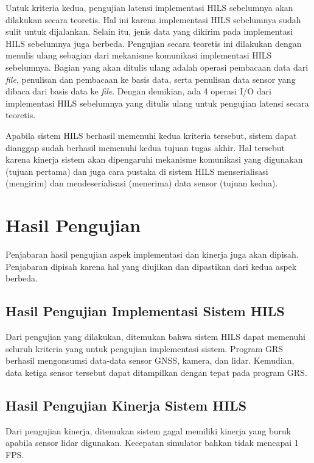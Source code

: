 Untuk kriteria kedua, pengujian latensi implementasi HILS sebelumnya akan
dilakukan secara teoretis. Hal ini karena implementasi HILS sebelumnya sudah
sulit untuk dijalankan. Selain itu, jenis data yang dikirim pada implementasi
HILS sebelumnya juga berbeda. Pengujian secara teoretis ini dilakukan dengan
menulis ulang sebagian dari mekanisme komunikasi implementasi HILS sebelumnya.
Bagian yang akan ditulis ulang adalah operasi pembacaan data dari \textit{file},
penulisan dan pembacaan ke basis data, serta penulisan data sensor yang dibaca
dari basis data ke \textit{file}. Dengan demikian, ada 4 operasi I/O dari
implementasi HILS sebelumnya yang ditulis ulang untuk pengujian latensi secara
teoretis.

Apabila sistem HILS berhasil memenuhi kedua kriteria tersebut, sistem dapat
dianggap sudah berhasil memenuhi kedua tujuan tugas akhir. Hal tersebut karena
kinerja sistem akan dipengaruhi mekanisme komunikasi yang digunakan (tujuan
pertama) dan juga cara pustaka di sistem HILS menserialisasi (mengirim) dan
mendeserialisasi (menerima) data sensor (tujuan kedua).

\section{Hasil Pengujian}

Penjabaran hasil pengujian aspek implementasi dan kinerja juga akan dipisah.
Penjabaran dipisah karena hal yang diujikan dan dipastikan dari kedua aspek
berbeda.

\subsection{Hasil Pengujian Implementasi Sistem HILS}

Dari pengujian yang dilakukan, ditemukan bahwa sistem HILS dapat memenuhi
seluruh kriteria yang untuk pengujian implementasi sistem. Program GRS berhasil
mengonsumsi data-data sensor GNSS, kamera, dan lidar. Kemudian, data ketiga
sensor tersebut dapat ditampilkan dengan tepat pada program GRS.

\subsection{Hasil Pengujian Kinerja Sistem HILS}

Dari pengujian kinerja, ditemukan sistem gagal memiliki kinerja yang buruk
apabila sensor lidar digunakan. Kecepatan simulator bahkan tidak mencapai 1 FPS.

